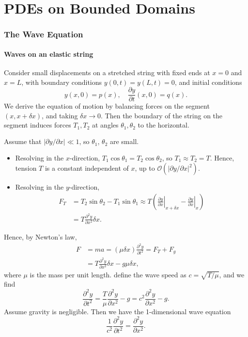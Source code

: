 \documentclass[12pt]{article}
\theoremstyle{definition}
\theoremstyle{remark}
\begin{document}
\newpage

\part{PDEs on Bounded Domains}%
\label{prt:pdes_on_bounded_domains}

\section{The Wave Equation}%
\label{sec:the_wave_equation}

\subsection{Waves on an elastic string}%
\label{sub:waves_on_an_elastic_string}

Consider small displacements on a stretched string with fixed ends at $x = 0$ and $x = L$, with boundary conditions $y(0, t) = y(L, t) = 0$, and initial conditions
\[
	y(x, 0) = p(x), \quad \frac{\partial y}{\partial t}(x, 0) = q(x)
.\]
We derive the equation of motion by balancing forces on the segment $(x, x + \delta x)$, and taking $\delta x \to 0$. Then the boundary of the string on the segment induces forces $T_1, T_2$ at angles $\theta_1, \theta_2$ to the horizontal.

Assume that $|\partial y/\partial x| \ll 1$, so $\theta_1$, $\theta_2$ are small.

\begin{itemize}
	\item Resolving in the $x$-direction, $T_1 \cos \theta_1 = T_2 \cos \theta_2$, so $T_1 \approx T_2 = T$. Hence, tension $T$ is a constant independent of $x$, up to $\mathcal{O}(|\partial y/\partial x|^2)$.
	\item Resolving in the $y$-direction,
		\begin{align*}
			F_T &= T_2 \sin \theta_2 - T_1 \sin \theta_1 \approx T \left( \left. \frac{\partial y}{\partial x}\right|_{x + \delta x} \!\!\!\!\!\! - \left. \frac{\partial y}{\partial x} \right|_{x}\right) \\
			    &= T \frac{\partial^2 y}{\partial x^2} \delta x.
		\end{align*}
\end{itemize}

Hence, by Newton's law,
\begin{align*}
	F &= ma = (\mu \delta x) \frac{\partial^2 y}{\partial t^2} = F_T + F_g \\
	&= T \frac{\partial^2 y}{\partial x^2} \delta x - g \mu \delta x,
\end{align*}
where $\mu$ is the mass per unit length. define the wave speed as $c = \sqrt{T/\mu}$, and we find
\[
\frac{\partial^2 y}{\partial t^2} = \frac{T}{\mu} \frac{\partial^2 y}{\partial x^2} - g = c^2 \frac{\partial^2 y}{\partial x^2} - g
.\] 
Assume gravity is negligible. Then we have the 1-dimensional wave equation
\[
\frac{1}{c^2} \frac{\partial^2 y}{\partial t^2} = \frac{\partial^2 y}{\partial x^2}
.\]
\end{document}
